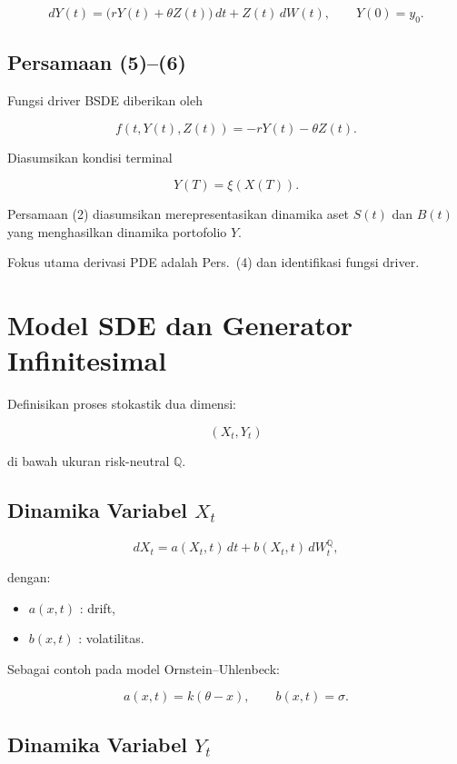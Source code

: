 \documentclass[12pt,a4paper]{article}
\begin{document}
\begin{equation}
dY(t)=\bigl(rY(t)+\theta Z(t)\bigr)\,dt+Z(t)\,dW(t),
\qquad
Y(0)=y_0.
\tag{4}
\end{equation}

\subsection*{Persamaan (5)--(6)}

Fungsi driver BSDE diberikan oleh

\begin{equation}
f(t,Y(t),Z(t))
=
-rY(t)-\theta Z(t).
\end{equation}

Diasumsikan kondisi terminal

\[
Y(T)=\xi(X(T)).
\]

Persamaan (2) diasumsikan merepresentasikan dinamika aset $S(t)$ dan $B(t)$ yang menghasilkan dinamika portofolio $Y$.

Fokus utama derivasi PDE adalah Pers.~(4) dan identifikasi fungsi driver.

\section{Model SDE dan Generator Infinitesimal}

Definisikan proses stokastik dua dimensi:

\[
(X_t,Y_t)
\]

di bawah ukuran risk-neutral $\mathbb Q$.

\subsection*{Dinamika Variabel $X_t$}

\begin{equation}
dX_t
=
a(X_t,t)\,dt
+
b(X_t,t)\,dW_t^{\mathbb Q},
\end{equation}

dengan:

\begin{itemize}
\item $a(x,t)$ : drift,
\item $b(x,t)$ : volatilitas.
\end{itemize}

Sebagai contoh pada model Ornstein--Uhlenbeck:

\[
a(x,t)=k(\theta-x),
\qquad
b(x,t)=\sigma.
\]

\subsection*{Dinamika Variabel $Y_t$}
\end{document}
